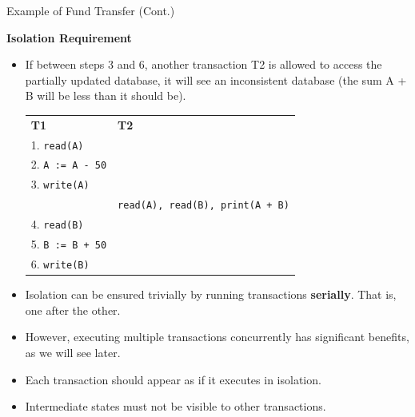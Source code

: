\documentclass{beamer}
\begin{document}
\begin{frame}{Example of Fund Transfer (Cont.)}

    \scriptsize
    \textbf{Isolation Requirement}
    \begin{itemize}
        \item If between steps 3 and 6, another transaction T2 is allowed to access the partially updated database, it will see an inconsistent database (the sum A + B will be less than it should be).
            \begin{tabular}{l l}
                \textbf{T1}                 & \textbf{T2} \\
                1. \texttt{read(A)}         &       \\
                2. \texttt{A := A - 50}     &       \\
                3. \texttt{write(A)}        &       \\
                                            &   \texttt{read(A), read(B), print(A + B)} \\
                4. \texttt{read(B)}         &       \\
                5. \texttt{B := B + 50}     &       \\
                6. \texttt{write(B)}        &       \\
            \end{tabular}

        \item Isolation can be ensured trivially by running transactions \textbf{serially}.  That is, one after the other.
        \item However, executing multiple transactions concurrently has significant benefits, as we will see later.
        \item Each transaction should appear as if it executes in isolation.
        \item Intermediate states must not be visible to other transactions.

    \end{itemize}
\end{frame}
\end{document}
